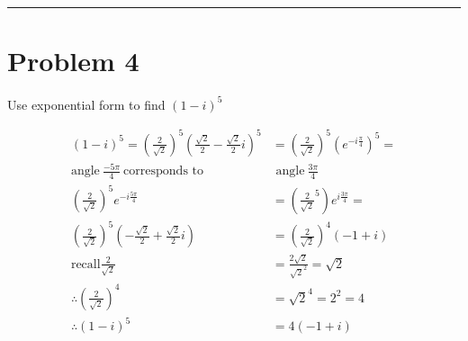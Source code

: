 \documentclass{article}
\begin{document}
\hrule

\section*{Problem 4}
Use exponential form to find $(1-i)^{5}$

\begin{align*}
  (1-i)^{5} = \left(\frac{2}{\sqrt{2}}\right)^5\left(\frac{\sqrt{2}}{2} - \frac{\sqrt{2}}{2}i\right)^5 &= \left(\frac{2}{\sqrt{2}}\right)^5 \left(e^{-i\frac{\pi}{4}}\right)^5 =\\
  \text{angle}\ \frac{-5\pi}{4}\ \text{corresponds to}&\text{ angle}\  \frac{3\pi}{4}\\
  \left(\frac{2}{\sqrt{2}}\right)^5e^{-i\frac{5\pi}{4}} &= \left(\frac{2}{\sqrt{2}}^5\right)e^{i\frac{3\pi}{4}} = \\
  \left(\frac{2}{\sqrt{2}}\right)^5 \left(-\frac{\sqrt{2}}{2}+\frac{\sqrt{2}}{2}i\right)&=  \left(\frac{2}{\sqrt{2}}\right)^4(-1+i)\\
  \text{recall} \frac{2}{\sqrt{2}} &= \frac{2\sqrt{2}}{\sqrt{2}^2} = \sqrt{2} \\
  \therefore \left(\frac{2}{\sqrt{2}}\right)^4 &= \sqrt{2}^4 = 2^2 = 4 \\
  \therefore (1-i)^{5} &= \boxed{4(-1+i)} 
\end{align*}

\vspace{6cm}
\end{document}
